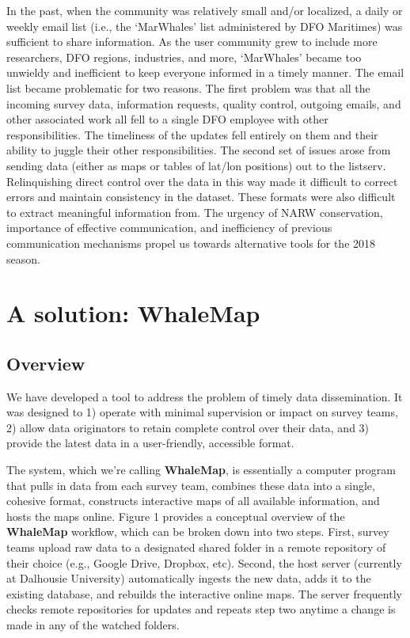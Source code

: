 \documentclass[11pt, letterpaper]{article}
\begin{document}
In the past, when the community was relatively small and/or localized, a daily or weekly email list (i.e., the `MarWhales' list administered by DFO Maritimes) was sufficient to share information. As the user community grew to include more researchers, DFO regions, industries, and more, `MarWhales' became too unwieldy and inefficient to keep everyone informed in a timely manner.  The email list became problematic for two reasons. The first problem was that all the incoming survey data, information requests, quality control, outgoing emails, and other associated work all fell to a single DFO employee with other responsibilities. The timeliness of the updates fell entirely on them and their ability to juggle their other responsibilities. The second set of issues arose from sending data (either as maps or tables of lat/lon positions) out to the listserv. Relinquishing direct control over the data in this way made it difficult to correct errors and maintain consistency in the dataset. These formats were also difficult to extract meaningful information from. The urgency of NARW conservation, importance of effective communication, and inefficiency of previous communication mechanisms propel us towards alternative tools for the 2018 season.

\newpage
\section{A solution: WhaleMap}

\subsection{Overview}

We have developed a tool to address the problem of timely data dissemination. It was designed to 1) operate with minimal supervision or impact on survey teams, 2) allow data originators to retain complete control over their data, and 3) provide the latest data in a user-friendly, accessible format. 

The system, which we're calling \textbf{WhaleMap}, is essentially a computer program that pulls in data from each survey team, combines these data into a single, cohesive format, constructs interactive maps of all available information, and hosts the maps online. Figure 1 provides a conceptual overview of the \textbf{WhaleMap} workflow, which can be broken down into two steps. First, survey teams upload raw data to a designated shared folder in a remote repository of their choice (e.g., Google Drive, Dropbox, etc). Second, the host server (currently at Dalhousie University) automatically ingests the new data, adds it to the existing database, and rebuilds the interactive online maps. The server frequently checks remote repositories for updates and repeats step two anytime a change is made in any of the watched folders.
\end{document}
